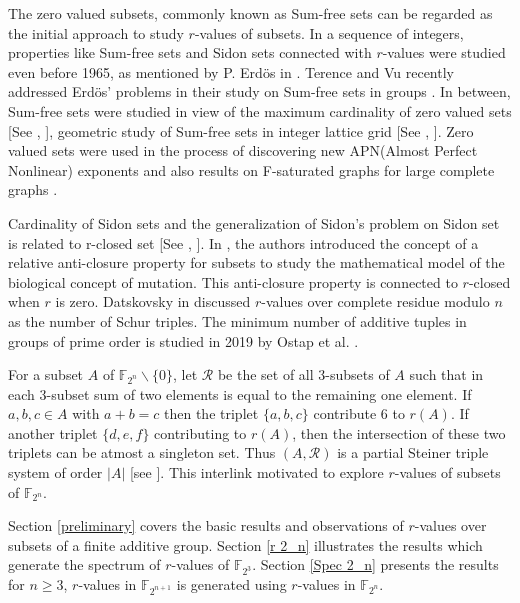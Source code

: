 \documentclass[12pt,a4paper]{article}
\begin{document}
	\par The zero valued subsets, commonly known as Sum-free sets can be regarded as the initial approach to study $r$-values of subsets. In a sequence of integers, properties like Sum-free sets and Sidon sets connected with $r$-values were studied even before 1965, as mentioned by P. Erdös in \cite{Erdo65}. Terence and Vu recently addressed Erdös' problems in their study on Sum-free sets in groups \cite{sumfreesurvey}. In between, Sum-free sets were studied in view of the maximum cardinality of zero valued sets [See \cite{axioms12080724}, \cite{cameron1990}],  geometric study of Sum-free sets in integer lattice grid [See \cite{LIU2023103614}, \cite{Elsholtz}]. Zero valued sets were used in the process of discovering new	APN(Almost Perfect Nonlinear) exponents \cite{Claude2023} and also results on F-saturated graphs for large complete graphs \cite{TIMMONS2022112659}.
	
	
	\par Cardinality of Sidon sets and the generalization of Sidon’s problem on Sidon set is related to r-closed set [See \cite{MARTIN2006591}, \cite{CILLERUELO20102786}]. In \cite{Mullin}, the authors introduced the concept of a relative anti-closure property for subsets to study the mathematical model of the biological concept of mutation. This anti-closure property is connected to $r$-closed when $r$ is zero. Datskovsky in \cite{DATSKOVSKY2003193} discussed $r$-values over complete residue modulo $n$ as the number of Schur triples. The minimum number of additive tuples in groups of prime order is studied in 2019 by Ostap et al. \cite{Chervak2017}.
	
	
	For a subset $A$ of $\mathbb{F}_{2^n}\backslash\{0\}$, let $\mathcal{R}$ be the set of all 3-subsets of $A$ such that in each 3-subset sum of two elements is equal to the remaining one element. If $a,b,c\in A$ with $a+b=c$ then the triplet $\{a,b,c\}$ contribute 6 to $r(A)$. If another triplet $\{d,e,f\}$ contributing to $r(A)$, then the intersection of these two triplets can be atmost a singleton set. Thus $(A,\mathcal{R})$ is a partial Steiner triple system of order $|A|$ [see \cite{steiner2020}]. This interlink motivated to explore $r$-values of subsets of $\mathbb{F}_{2^n}$. 
	
	Section \ref{preliminary} covers the basic results and observations of $r$-values over subsets of a finite additive group. Section \ref{r 2_n} illustrates the results which generate the spectrum of $r$-values of $\mathbb{F}_{2^3}$. Section \ref{Spec 2_n} presents the results for $n\geq3$, $r$-values in $\mathbb{F}_{2^{n+1}}$ is generated using $r$-values in $\mathbb{F}_{2^n}$. 
	
\end{document}
